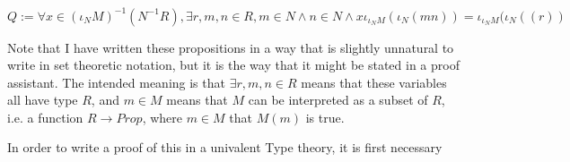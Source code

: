 \documentclass[12pt]{article} %
\theoremstyle{definition}
\theoremstyle{definition}
\theoremstyle{definition}
\theoremstyle{definition}
\begin{document}
\begin{equation}
  Q := \forall x \in (\iota_N M)^{-1}(N^{-1}R), \exists r, m, n \in R, m \in N \wedge n \in N \wedge x\iota_{\iota_N M}(\iota_N(mn)) =
  \iota_{\iota_N M}(\iota_N((r))
\end{equation}

Note that I have written these propositions in a way that is slightly unnatural to write in set theoretic notation,
but it is the way that it might be stated in a proof assistant. The intended meaning is that
$\exists r,m,n \in R$ means that these variables all have type $R$, and $m \in M$ means that $M$ can be interpreted as a
subset of $R$, i.e. a function $R \to Prop$, where $m \in M$ that $M(m)$ is true.

In order to write a proof of this in a univalent Type theory, it is first necessary
\end{document}
